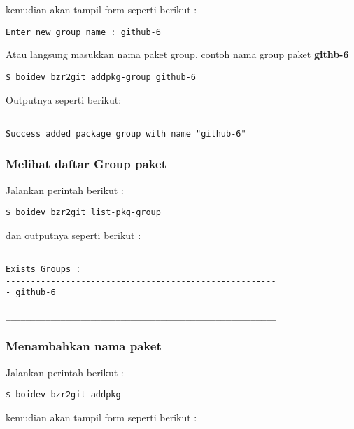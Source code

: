 {\noindent
kemudian akan tampil form seperti berikut :

\begin{lstlisting}[language=ShellBash]
Enter new group name : github-6
\end{lstlisting}

\noindent
Atau langsung masukkan nama paket group, contoh nama group paket \textbf{githb-6}

\begin{lstlisting}[language=ShellBash]
$ boidev bzr2git addpkg-group github-6
\end{lstlisting}

\noindent
Outputnya seperti berikut:

\begin{lstlisting}[language=ShellBash]

Success added package group with name "github-6"
\end{lstlisting}

\subsubsection{Melihat daftar Group paket}
\label{subsubsec:list-pkg-group}
\noindent
Jalankan perintah berikut :

\begin{lstlisting}[language=ShellBash]
$ boidev bzr2git list-pkg-group
\end{lstlisting}

\noindent
dan outputnya seperti berikut :

\begin{lstlisting}[language=ShellBash]

Exists Groups : 
------------------------------------------------------
- github-6

______________________________________________________
\end{lstlisting}

\subsubsection{Menambahkan nama paket}
\label{subsubsec:addpkg}
\noindent
Jalankan perintah berikut :

\begin{lstlisting}[language=ShellBash]
$ boidev bzr2git addpkg
\end{lstlisting}

\noindent
kemudian akan tampil form seperti berikut :

}
